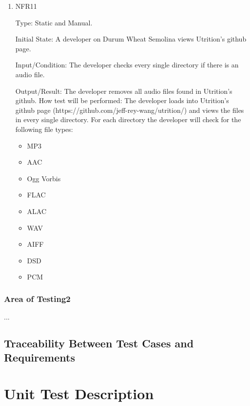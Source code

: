 \documentclass[12pt, titlepage]{article}
\begin{document}
\begin{enumerate}
\item{NFR11\\}

Type: Static and Manual.

Initial State: A developer on Durum Wheat Semolina views Utrition’s github page. 

Input/Condition: The developer checks every single directory if there is an audio file.

Output/Result: The developer removes all audio files found in Utrition’s github.
How test will be performed: The developer loads into Utrition’s github page (https://github.com/jeff-rey-wang/utrition/) and views the files in every single directory. For each directory the developer will check for the following file types:

\begin{itemize}
	\item MP3
	\item AAC
	\item Ogg Vorbis
	\item FLAC
	\item ALAC
	\item WAV
	\item AIFF
	\item DSD
	\item PCM
\end{itemize}
\end{enumerate}

\subsubsection{Area of Testing2}

...

\subsection{Traceability Between Test Cases and Requirements}


\section{Unit Test Description}

\end{document}

